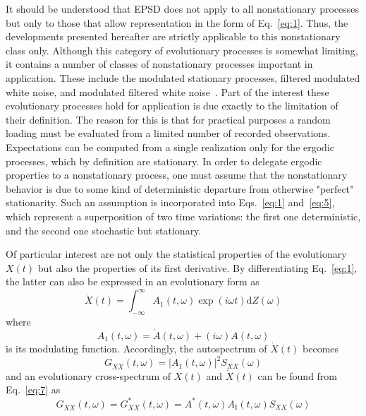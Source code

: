 \documentclass[12pt]{article}
\begin{document}
It should be understood that EPSD does not apply to all nonstationary processes but only to those that allow representation in the form of Eq.~\eqref{eq:1}. Thus, the developments presented hereafter are strictly applicable to this nonstationary class only. Although this category of evolutionary processes is somewhat limiting, it contains a number of classes of nonstationary processes important in application. These include the modulated stationary processes, filtered modulated white noise, and modulated filtered white noise~\cite{NigamNarayanan1994}. Part of the interest these evolutionary processes hold for application is due exactly to the limitation of their definition. The reason for this is that for practical purposes a random loading must be evaluated from a limited number of recorded observations. Expectations can be computed from a single realization only for the ergodic processes, which by definition are stationary. In order to delegate ergodic properties to a nonstationary process, one must assume that the nonstationary behavior is due to some kind of deterministic departure from otherwise "perfect" stationarity. Such an assumption is incorporated into Eqs.~\eqref{eq:1} and~\eqref{eq:5}, which represent a superposition of two time variations: the first one deterministic, and the second one stochastic but stationary.

Of particular interest are not only the statistical properties of the evolutionary $X(t)$ but also the properties of its first derivative. By differentiating Eq.~\eqref{eq:1}, the latter can also be expressed in an evolutionary form as
\begin{equation}
\dot{X}(t)=\int_{-\infty}^{\infty} A_{1}(t, \omega) \exp (i \omega t) \mathrm{d} Z(\omega)
\label{eq:9}
\end{equation}
where
\begin{equation}
A_{1}(t, \omega)=\dot{A}(t, \omega)+(i \omega) A(t, \omega)
\label{eq:10}
\end{equation}
is its modulating function. Accordingly, the autospectrum of $\dot{X}(t)$ becomes
\begin{equation}
G_{\dot{X} \dot{X}}(t, \omega)=\left|A_{1}(t, \omega)\right|^{2} S_{X X}(\omega)
\label{eq:11}
\end{equation}
and an evolutionary cross-spectrum of $X(t)$ and $\dot{X}(t)$ can be found from Eq.~\eqref{eq:7} as
\begin{equation}
G_{X \dot{X}}(t, \omega)=G_{\dot{X} X}^{*}(t, \omega)=A^{*}(t, \omega) A_{\mathrm{I}}(t, \omega) S_{X X}(\omega)
\label{eq:12}
\end{equation}
\end{document}
